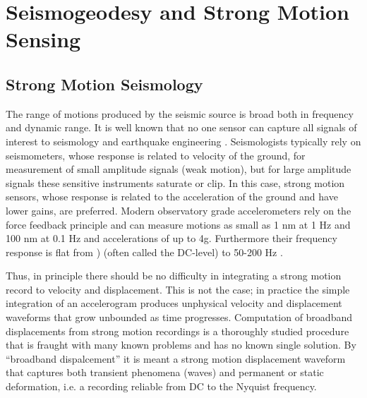 
\chapter{Seismogeodesy and Strong Motion Sensing}

\section{Strong Motion Seismology}
The range of motions produced by the seismic source is broad both in frequency and dynamic range. It is well known that no one sensor can capture all signals of interest to seismology and earthquake engineering \citep{Havskov2006}. Seismologists typically rely on seismometers, whose response is related to velocity of the ground, for measurement of small amplitude signals (weak motion), but for large amplitude signals these sensitive instruments saturate or clip. In this case, strong motion sensors, whose response is related to the acceleration of the ground and have lower gains, are preferred. Modern observatory grade accelerometers rely on the force feedback principle and can measure motions as small as 1 nm at 1 Hz and 100 nm at 0.1 Hz and accelerations of up to 4g. Furthermore their frequency response is flat from ) (often called the DC-level) to 50-200 Hz \citep{Havskov2006}.

Thus, in principle there should be no difficulty in integrating a strong motion record to velocity and displacement. This is not the case; in practice the simple integration of an accelerogram produces unphysical velocity and displacement waveforms that grow unbounded as time progresses. Computation of broadband displacements from strong motion recordings is a thoroughly studied procedure that is fraught with many known problems and has no known single solution. By ``broadband dispalcement'' it is meant a strong motion displacement waveform that captures both transient phenomena (waves) and permanent or static deformation, i.e. a recording reliable from DC to the Nyquist frequency.

